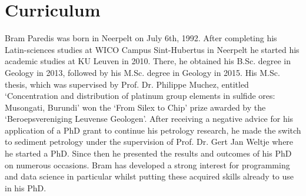 \chapter{Curriculum}\label{ch:curriculum}

Bram Paredis was born in Neerpelt on July 6th, 1992. %
After completing his Latin-sciences studies at WICO Campus Sint-Hubertus in Neerpelt he started his academic studies at KU Leuven in 2010. %
There, he obtained his B.Sc. degree in Geology in 2013, followed by his M.Sc. degree in Geology in 2015. %
His M.Sc. thesis, which was supervised by Prof. Dr. Philippe Muchez, entitled `Concentration and distribution of platinum group elements in sulfide ores: Musongati, Burundi' won the `From Silex to Chip' prize awarded by the `Beroepsvereniging Leuvense Geologen'. %
After receiving a negative advice for his application of a PhD grant to continue his petrology research, he made the switch to sediment petrology under the supervision of Prof. Dr. Gert Jan Weltje where he started a PhD. %
Since then he presented the results and outcomes of his PhD on numerous occasions. %
Bram has developed a strong interest for programming and data science in particular whilst putting these acquired skills already to use in his PhD. %


\instructionscv


\cleardoublepage

